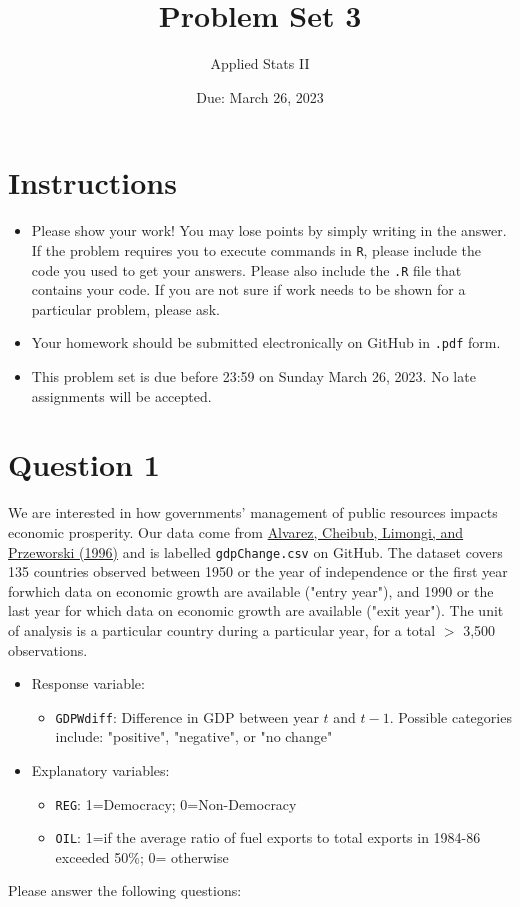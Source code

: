 \documentclass[12pt,letterpaper]{article}
\title{Problem Set 3}
\date{Due: March 26, 2023}
\author{Applied Stats II}
\begin{document}
	\maketitle
	\section*{Instructions}
	\begin{itemize}
	\item Please show your work! You may lose points by simply writing in the answer. If the problem requires you to execute commands in \texttt{R}, please include the code you used to get your answers. Please also include the \texttt{.R} file that contains your code. If you are not sure if work needs to be shown for a particular problem, please ask.
\item Your homework should be submitted electronically on GitHub in \texttt{.pdf} form.
\item This problem set is due before 23:59 on Sunday March 26, 2023. No late assignments will be accepted.
	\end{itemize}

	\vspace{.25cm}
\section*{Question 1}
\vspace{.25cm}
\noindent We are interested in how governments' management of public resources impacts economic prosperity. Our data come from \href{https://www.researchgate.net/profile/Adam_Przeworski/publication/240357392_Classifying_Political_Regimes/links/0deec532194849aefa000000/Classifying-Political-Regimes.pdf}{Alvarez, Cheibub, Limongi, and Przeworski (1996)} and is labelled \texttt{gdpChange.csv} on GitHub. The dataset covers 135 countries observed between 1950 or the year of independence or the first year forwhich data on economic growth are available ("entry year"), and 1990 or the last year for which data on economic growth are available ("exit year"). The unit of analysis is a particular country during a particular year, for a total $>$ 3,500 observations. 

\begin{itemize}
	\item
	Response variable: 
	\begin{itemize}
		\item \texttt{GDPWdiff}: Difference in GDP between year $t$ and $t-1$. Possible categories include: "positive", "negative", or "no change"
	\end{itemize}
	\item
	Explanatory variables: 
	\begin{itemize}
		\item
		\texttt{REG}: 1=Democracy; 0=Non-Democracy
		\item
		\texttt{OIL}: 1=if the average ratio of fuel exports to total exports in 1984-86 exceeded 50\%; 0= otherwise
	\end{itemize}
	
\end{itemize}
\newpage
\noindent Please answer the following questions:
\end{document}
